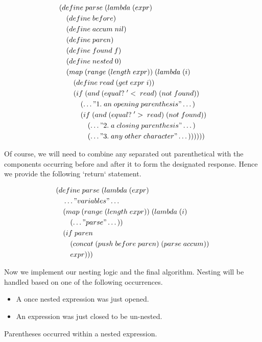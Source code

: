 \begin{align*}
& (define \; parse \; (lambda \; (expr) \; 
\\& \quad (define \; before)
\\& \quad (define \; accum \; nil)
\\& \quad (define \; paren)
\\& \quad (define \; found \; f)
\\& \quad (define \; nested \; 0)
\\& \quad (map \; (range \; (length \; expr)) \; (lambda \; (i)
\\& \qquad (define \; read \; (get \; expr \; i))
\\& \qquad (if \; (and \; (equal? \; '< \; read) \; (not \; found))
\\& \qquad \quad (\dots"1. \; an \; opening \; parenthesis"\dots)
\\& \qquad \quad (if \; (and \; (equal? \; '> \; read) \; (not \; found))
\\& \qquad \qquad (\dots"2. \; a \; closing \; parenthesis"\dots)
\\& \qquad \qquad (\dots"3. \; any \; other \; character"\dots))))))
\end{align*}

Of course, we will need to combine any separated out parenthetical with the components 
occurring before and after it to form the designated response. Hence we provide the 
following `return` statement.

\begin{align*}
& (define \; parse \; (lambda \; (expr) \; 
\\& \quad \dots"variables"\dots
\\& \quad (map \; (range \; (length \; expr)) \; (lambda \; (i)
\\& \qquad (\dots"parse"\dots))
\\& \quad (if \; paren
\\& \qquad (concat \; (push \; before \; paren) \; (parse \; accum))
\\& \qquad expr)))
\end{align*}

Now we implement our nesting logic and the final algorithm. Nesting will be handled 
based on one of the following occurrences.

\begin{itemize}
  \item A once nested expression was just opened.
  \item An expression was just closed to be un-nested.
\end{itemize}
 Parentheses occurred within a nested expression.

